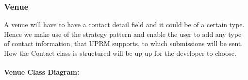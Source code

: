 \subsubsection{Venue}
A venue will have to have a contact detail field and it could be of a certain type. Hence we make use of the strategy pattern and enable the user to add any type of contact information, that UPRM supports, to which submissions will be sent. How the Contact class is structured will be up up for the developer to choose.\\ \\
\textbf{Venue Class Diagram:}\\
\centerline{}